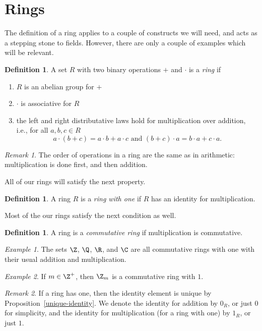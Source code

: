 \documentclass[12pt]{amsart}
\theoremstyle{plain}
\theoremstyle{definition}
\newtheorem{defn}[thm]{Definition}
\theoremstyle{remark}
\newtheorem*{remark}{Remark}
\newtheorem*{exam}{Example}
\begin{document}
\section{Rings}
The definition of a ring applies to a couple of constructs we will
need, and acts as a stepping stone to fields.  However, there are only
a couple of examples which will be relevant.

\begin{defn}
  A set $R$ with two binary operations $+$ and $\cdot$ is a \emph{ring}
  if 
  \begin{enumerate}
  \item $R$ is an abelian group for $+$
  \item $\cdot $ is associative for $R$
  \item the left and right distributative laws hold for multiplication
    over addition, i.e., for all $a,b,c\in R$
    \[a\cdot(b+c) = a\cdot b+a\cdot c \text{ and } (b+c)\cdot a=b\cdot
    a+c\cdot a.\]
  \end{enumerate}
\end{defn}
\begin{remark}
  The order of operations in a ring are the same as in arithmetic:
  multiplication is done first, and then addition.
\end{remark}
All of our rings will satisfy the next property.
\begin{defn}
  A ring $R$ is a \emph{ring with one} if $R$ has an identity for
  multiplication.
\end{defn}
Most of the our rings satisfy the next condition as well.
\begin{defn}
  A ring is a \emph{commutative ring} if multiplication is
  commutative.
\end{defn}

\begin{exam}
  The sets $\Z$, $\Q$, $\R$, and $\C$ are all commutative rings with
  one with their usual addition and multiplication.
\end{exam}

\begin{exam}
  If $m\in\Z^+$, then $\Z_m$ is a commutative ring with $1$.
\end{exam}

\begin{remark}
  If a ring has one, then the identity element is unique by
  Proposition~\ref{unique-identity}.  We denote the identity for
  addition by $0_R$, or just $0$ for simplicity, and the identity for
  multiplication (for a ring with one) by $1_R$, or just $1$.
\end{remark}
\end{document}
